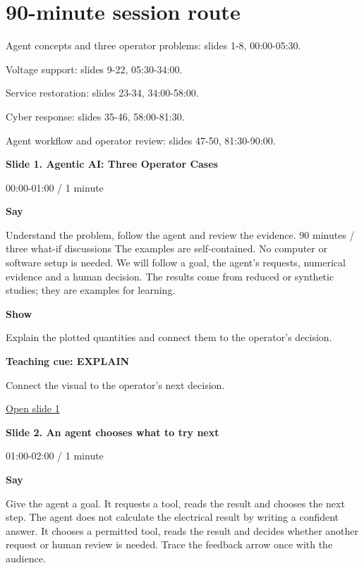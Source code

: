 \documentclass[12pt,letterpaper]{article}
\begin{document}
\section*{90-minute session route}
Agent concepts and three operator problems: slides 1-8, 00:00-05:30.\par
Voltage support: slides 9-22, 05:30-34:00.\par
Service restoration: slides 23-34, 34:00-58:00.\par
Cyber response: slides 35-46, 58:00-81:30.\par
Agent workflow and operator review: slides 47-50, 81:30-90:00.\par
\clearpage{}
{\Large\bfseries\color{IEEEBlue} Slide 1. Agentic AI: Three Operator Cases\par}\medskip
{\small\color{Slate} 00:00-01:00 /\allowbreak{} 1 minute\par}\medskip
\textbf{Say}\par Understand the problem, follow the agent and review the evidence. 90 minutes /\allowbreak{} three what-if discussions The examples are self-contained. No computer or software setup is needed. We will follow a goal, the agent's requests, numerical evidence and a human decision. The results come from reduced or synthetic studies; they are examples for learning.\par\medskip
\textbf{Show}\par Explain the plotted quantities and connect them to the operator's decision.\par\medskip
\textbf{Teaching cue: EXPLAIN}\par Connect the visual to the operator's next decision.\par\medskip
\vfill\href{https://alaaselim-sudo.github.io/GridGuard-Agentic-AI-Tutorials/operator-cases/#/1}{Open slide 1}\par
\clearpage{}
{\Large\bfseries\color{IEEEBlue} Slide 2. An agent chooses what to try next\par}\medskip
{\small\color{Slate} 01:00-02:00 /\allowbreak{} 1 minute\par}\medskip
\textbf{Say}\par Give the agent a goal. It requests a tool, reads the result and chooses the next step. The agent does not calculate the electrical result by writing a confident answer. It chooses a permitted tool, reads the result and decides whether another request or human review is needed. Trace the feedback arrow once with the audience.\par\medskip
\end{document}
